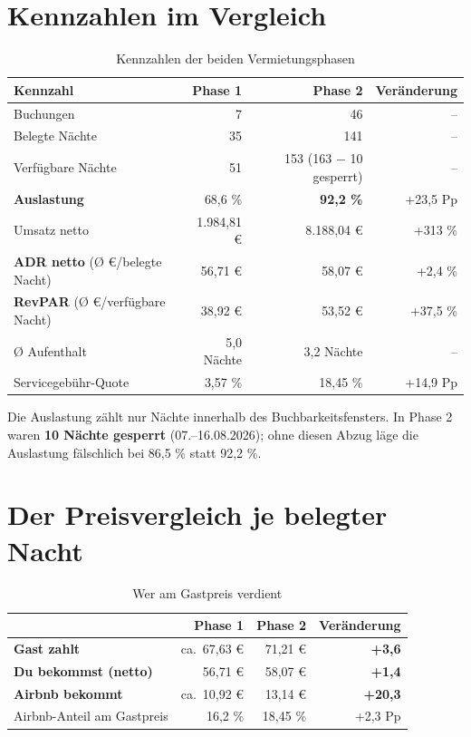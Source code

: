 \documentclass[11pt,a4paper]{article}
\begin{document}
\section{Kennzahlen im Vergleich}

\begin{table}[H]
\centering
\small
\begin{tabular}{@{}lrrr@{}}
\toprule
\textbf{Kennzahl} & \textbf{Phase 1} & \textbf{Phase 2} & \textbf{Veränderung} \\
\midrule
Buchungen & 7 & 46 & – \\
Belegte Nächte & 35 & 141 & – \\
Verfügbare Nächte & 51 & 153 (163 $-$ 10 gesperrt) & – \\
\textbf{Auslastung} & 68,6 \% & \textbf{92,2 \%} & +23,5 Pp \\
Umsatz netto & 1.984,81 € & 8.188,04 € & +313 \% \\
\textbf{ADR netto} (Ø €/belegte Nacht) & 56,71 € & 58,07 € & +2,4 \% \\
\textbf{RevPAR} (Ø €/verfügbare Nacht) & 38,92 € & 53,52 € & +37,5 \% \\
Ø Aufenthalt & 5,0 Nächte & 3,2 Nächte & – \\
Servicegebühr-Quote & 3,57 \% & 18,45 \% & +14,9 Pp \\
\bottomrule
\end{tabular}
\caption{Kennzahlen der beiden Vermietungsphasen}
\end{table}

Die Auslastung zählt nur Nächte innerhalb des Buchbarkeitsfensters. In Phase 2 waren
\textbf{10 Nächte gesperrt} (07.--16.08.2026); ohne diesen Abzug läge die Auslastung
fälschlich bei 86,5 \% statt 92,2 \%.

\section{Der Preisvergleich je belegter Nacht}

\begin{table}[H]
\centering
\begin{tabular}{@{}lrrr@{}}
\toprule
 & \textbf{Phase 1} & \textbf{Phase 2} & \textbf{Veränderung} \\
\midrule
\textbf{Gast zahlt} & ca.\ 67,63 € & 71,21 € & \textbf{+3,6} \\
\textbf{Du bekommst (netto)} & 56,71 € & 58,07 € & \textbf{+1,4} \\
\textbf{Airbnb bekommt} & ca.\ 10,92 € & 13,14 € & \textbf{+20,3} \\
Airbnb-Anteil am Gastpreis & 16,2 \% & 18,45 \% & +2,3 Pp \\
\bottomrule
\end{tabular}
\caption{Wer am Gastpreis verdient}
\end{table}
\end{document}
